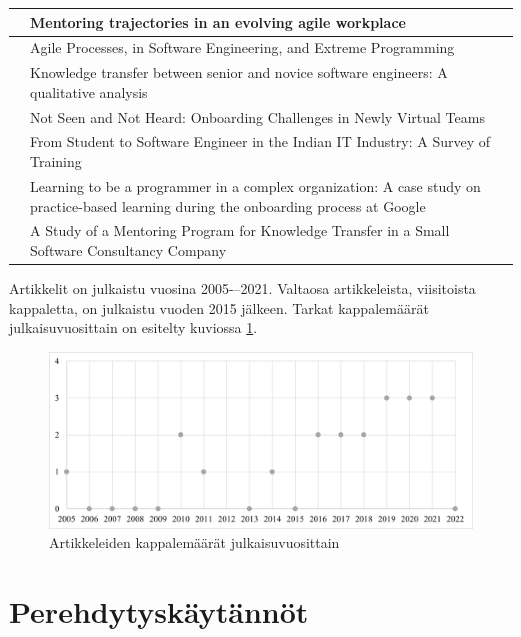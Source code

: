 \documentclass[utf8]{gradu3}
\begin{document}
\begin{footnotesize}
\begin{longtable}{ m{4cm}  m{10.5cm} }
\hline
\textcite{kumar-ym-2016} & Mentoring trajectories in an evolving agile workplace \\
\hline
\textcite{shannon-pool-2016} & Agile Processes, in Software Engineering, and Extreme Programming \\
\hline
\textcite{viana-ym-2014} & Knowledge transfer between senior and novice software engineers: A qualitative analysis \\
\hline
\textcite{hemphill-begel-2011} & Not Seen and Not Heard: Onboarding Challenges in Newly Virtual Teams \\
\hline
\textcite{kulkarni-ym-2010} & From Student to Software Engineer in the Indian IT Industry: A Survey of Training \\
\hline
 \textcite{johnson-senges-2010} & Learning to be a programmer in a complex organization: A case study on practice-based learning during the onboarding process at Google\\
\hline
\textcite{bjornson-dingsøyr-2005} & A Study of a Mentoring Program for Knowledge Transfer in a Small Software Consultancy Company \\

\hline
\end{longtable}
\end{footnotesize}

Artikkelit on julkaistu vuosina 2005-–2021. Valtaosa artikkeleista, viisitoista kappaletta, on julkaistu vuoden 2015 jälkeen. Tarkat kappalemäärät julkaisuvuosittain on esitelty kuviossa \ref{kuvio:kappalemaarat-julkaisuvuosittain-tiivis}.

\begin{figure}[h]
    \centering
    \includegraphics[width=\textwidth]{media/kappalemaarat-julkaisuvuosittain-tiivis.png}
    \caption{Artikkeleiden kappalemäärät julkaisuvuosittain}
    \label{kuvio:kappalemaarat-julkaisuvuosittain-tiivis}
\end{figure}

\section{Perehdytyskäytännöt}
\label{luku-tulokset-kaytannot}
\end{document}
